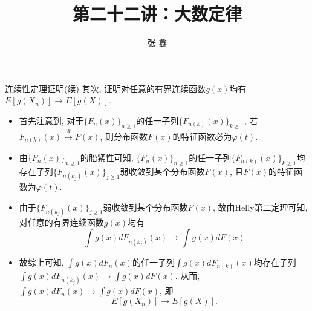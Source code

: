 \begin{frame}{连续性定理证明(续)}
其次, 证明对任意的有界连续函数$g(x)$均有 $E[g(X_n)]\rightarrow E[g(X)]$. \pause
\begin{itemize}[<+-|alert@+>]
\item 首先注意到, 对于$\{F_n(x)\}_{n\geq 1}$的任一子列$\{F_{n(k)}(x)\}_{k\geq 1}$, 若$F_{n(k)} (x)\stackrel{W}{\rightarrow} F (x)$, 则分布函数$F(x)$的特征函数必为$\varphi(t)$.
\item 由$\{F_n(x)\}_{n\geq 1}$的胎紧性可知, $\{F_n(x)\}_{n\geq 1}$的任一子列$\{F_{n(k)}(x)\}_{k\geq 1}$均存在子列$\{F_{n(k_j)}(x)\}_{j\geq 1}$弱收敛到某个分布函数$F(x)$, 且$F(x)$的特征函数为$\varphi(t)$.

\item 由于$\{F_{n(k_j)}(x)\}_{j\geq 1}$弱收敛到某个分布函数$F(x)$, 故由Helly第二定理可知, 对任意的有界连续函数$g(x)$均有
\[\int g(x)dF_{n(k_j)}(x)\rightarrow \int g(x)dF(x)\]

\item 故综上可知, $\int g(x)dF_{n}(x)$的任一子列$\int g(x)dF_{n(k)}(x)$均存在子列$\int g(x)dF_{n(k_j)}(x)\rightarrow \int g(x)dF(x)$. 从而, $\int g(x)dF_{n}(x)\rightarrow \int g(x)dF(x)$, 即 $$E[g(X_n)]\rightarrow E[g(X)].$$
\end{itemize}

\end{frame}


\title[概率论]{第二十二讲：大数定律}
\author[张鑫{\rm Email: x.zhang.seu@foxmail.com} ]{\large 张 鑫}
\date{}


{ 
	\begin{frame}
		\titlepage
	\end{frame}
}

